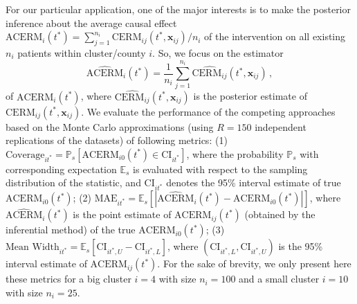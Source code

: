 \documentclass[aoas]{imsart}
\theoremstyle{plain}
\theoremstyle{definition}
\begin{document}
For our particular application, one of the major interests is to make the posterior inference about the average causal effect $\text{ACERM}_i(t^*)=\sum_{j=1}^{n_i}\text{CERM}_{ij}(t^*,\mathbf{x}_{ij})/n_i$ of the intervention on  all existing $n_i$ patients within cluster/county $i$. So, we focus on the estimator 
\begin{equation}
\widehat{\text{ACERM}}_i(t^*) = \frac{1}{n_i} \sum_{j=1}^{n_i} \widehat{\text{CERM}_{ij}}(t^*, \mathbf{x}_{ij})
\hspace{2pt},
\label{eq:ACERM}
\end{equation}
of  $\text{ACERM}_i(t^*)$, where  $\widehat{\text{CERM}_{ij}}(t^*, \mathbf{x}_{ij})$ is the posterior estimate of ${\text{CERM}_{ij}}(t^*, \mathbf{x}_{ij})$. We evaluate the performance of the competing approaches based on the Monte Carlo approximations (using $R=150$ independent replications of the datasets) of following metrics:
(1) $\text{Coverage}_{it^*}=\mathbb{P}_s[\text{ACERM}_{i0}(t^*)\in \text{CI}_{it^*}]$,
where the probability $\mathbb{P}_s$ with corresponding expectation $\mathbb{E}_s$ is evaluated with respect to the sampling distribution of the statistic, and $\text{CI}_{it^*}$ denotes the 95\% interval estimate of true $\text{ACERM}_{i0}(t^*)$; 
(2) $\text{MAE}_{it^*} = \mathbb{E}_s[|\widehat{\text{ACERM}}_{i}(t^*) - \text{ACERM}_{i0}(t^*)|]$,
where $\widehat{\text{ACERM}}_{i}(t^*)$ is the point estimate of  $\text{ACERM}_{ij}(t^*)$ (obtained by the inferential method) of the true $\text{ACERM}_{i0}(t^*)$;  (3) $\text{Mean Width}_{it^*} = \mathbb{E}_s[\text{CI}_{it^*,U} - \text{CI}_{it^*,L}]$, where  $(\text{CI}_{it^*,L},\text{CI}_{it^*,U})$ is the 95\% interval estimate of $\text{ACERM}_{ij}(t^*)$. 
For the sake of brevity, we only present here these metrics for a big cluster $i=4$ with size $n_i=100$ and a small cluster $i=10$ with size $n_i=25$. 




\end{document}
